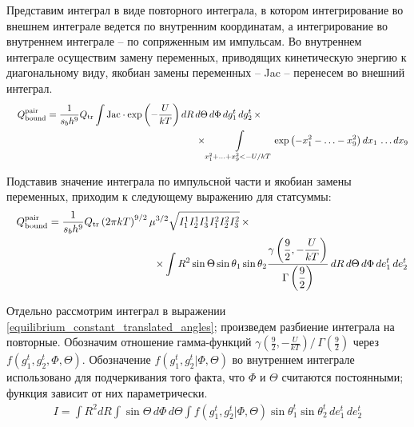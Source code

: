 \documentclass[14pt]{extarticle}
\newcommand{\lb}{\left(}
\newcommand{\rb}{\right)}
\begin{document}
Представим интеграл в виде повторного интеграла, в котором интегрирование во внешнем интеграле ведется по внутренним координатам, а интегрирование во внутреннем интеграле -- по сопряженным им импульсам. Во внутреннем интеграле осуществим замену переменных, приводящих кинетическую энергию к диагональному виду, якобиан замены переменных -- Jac -- перенесем во внешний интеграл.  
\begin{gather}
	Q_{\text{bound}}^{\text{pair}} = \frac{1}{s_b h^9} Q_{\text{tr}} \int \text{Jac} \cdot \exp \lb -\frac{U}{k T} \rb dR \, d\Theta \, d\Phi \, dg_1^t \, dg_2^t \, \times \notag \hspace{5cm} \\
	\hspace{7cm} \times \int\limits_{x_1^2 + \ldots + x_9^2 < -U/kT} \exp \lb -x_1^2 - \ldots -x_9^2 \rb dx_1 \, \ldots dx_9 
\end{gather}

Подставив значение интеграла по импульсной части и якобиан замены переменных, приходим к следующему выражению для статсуммы:
\begin{gather}
	Q_{\text{bound}}^{\text{pair}} = \frac{1}{s_b h^9} Q_{\text{tr}} \lb 2 \pi k T \rb^{9/2} \mu^{3/2} \sqrt{I_1^1 I_2^1 I_3^1 I_1^2 I_2^2 I_3^2} \, \times \hspace{5cm} \notag \\
	\hspace{5cm} \times \int R^2 \sin \Theta \sin \theta_1 \sin \theta_2 \frac{\displaystyle \gamma \lb \frac{9}{2}, - \frac{U}{k T} \rb}{\displaystyle \Gamma \lb \frac{9}{2} \rb} \, dR \, d\Theta \, d\Phi \, de_1^t \, de_2^t \label{equilibrium_constant_translated_angles} 
\end{gather}

Отдельно рассмотрим интеграл в выражении \eqref{equilibrium_constant_translated_angles}; произведем разбиение интеграла на повторные. Обозначим отношение гамма-функций $\displaystyle \gamma \lb \frac{9}{2}, -\frac{U}{kT} \rb / \, \Gamma \lb \frac{9}{2} \rb$ через $f(g_1^t, g_2^t, \Phi, \Theta)$. Обозначение $f \lb g_1^t, g_2^t \rvert \Phi, \Theta \rb$ во внутреннем интеграле использовано для подчеркивания того факта, что $\Phi$ и $\Theta$ считаются постоянными; функция зависит от них параметрически.
\begin{gather}
	I = \int R^2 dR \int \sin \Theta \, d\Phi \, d\Theta \int f \lb g_1^t, g_2^t \rvert \Phi, \Theta \rb \sin \theta_1^t \sin \theta_2^t \, de_1^t \, de_2^t
\end{gather}
\end{document}
